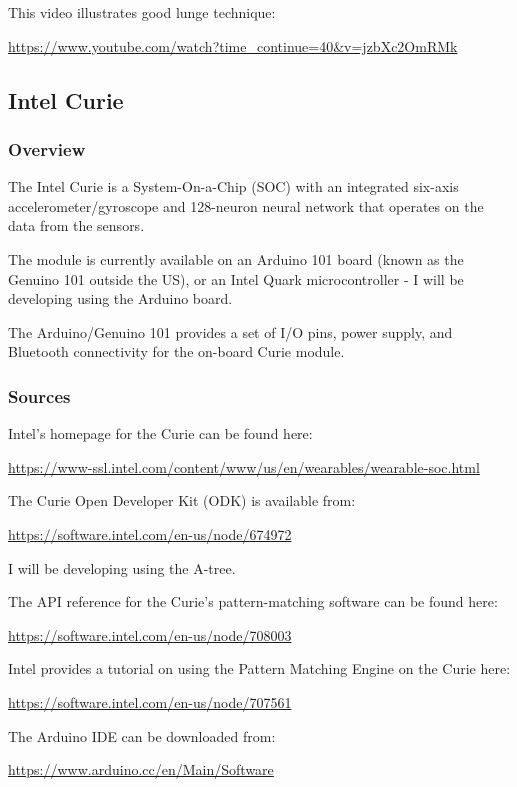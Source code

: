 \documentclass[a4paper]{article}
\begin{document}
This video illustrates good lunge technique:

\url{https://www.youtube.com/watch?time_continue=40&v=jzbXc2OmRMk}

\newpage
\subsection{Intel Curie}%

\subsubsection{Overview}

The Intel Curie is a System-On-a-Chip (SOC) with an integrated six-axis accelerometer/gyroscope and 128-neuron neural network that operates on the data from the sensors.

The module is currently available on an Arduino 101 board (known as the Genuino 101 outside the US), or an Intel Quark microcontroller - I will be developing using the Arduino board.

The Arduino/Genuino 101 provides a set of I/O pins, power supply, and Bluetooth connectivity for the on-board Curie module.

\subsubsection{Sources}

Intel's homepage for the Curie can be found here:

\url{https://www-ssl.intel.com/content/www/us/en/wearables/wearable-soc.html}

The Curie Open Developer Kit (ODK) is available from:

\url{https://software.intel.com/en-us/node/674972}

I will be developing using the A-tree.

The API reference for the Curie's pattern-matching software can be found here:

\url{https://software.intel.com/en-us/node/708003}

Intel provides a tutorial on using the Pattern Matching Engine on the Curie here:

\url{https://software.intel.com/en-us/node/707561}

The Arduino IDE can be downloaded from:

\url{https://www.arduino.cc/en/Main/Software}
\end{document}

